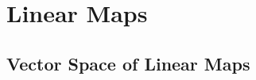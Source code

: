 \chapter{Linear Maps}

\section{Vector Space of Linear Maps}

\begin{exercise}
    \td \\
\end{exercise}

\begin{solution}
    \\ \td \\
\end{solution}